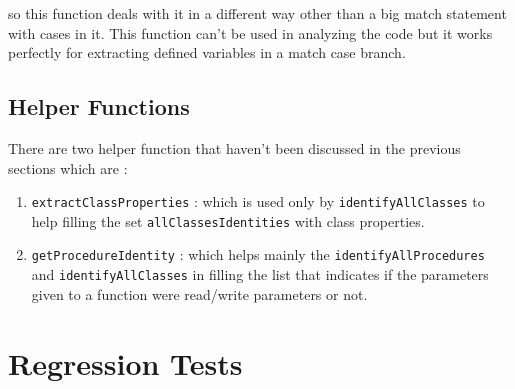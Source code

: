 \documentclass[11pt]{report}
\begin{document}
so this function deals with it in a different way other than a big match statement with cases in it. This function can't be used in analyzing the code but it works perfectly for extracting defined variables in a match case branch.

\section{Helper Functions}
There are two helper function that haven't been discussed in the previous sections which are :

\begin{enumerate}
\item \texttt{extractClassProperties} : which is used only by \texttt{identifyAllClasses} to help filling the set \texttt{allClassesIdentities} with class properties.

\item \texttt{getProcedureIdentity} : which helps mainly the \texttt{identifyAllProcedures} and \texttt{identifyAllClasses} in filling the list that indicates if the parameters given to a function were read/write parameters or not.
\end{enumerate}



\chapter{Regression Tests}
\end{document}
